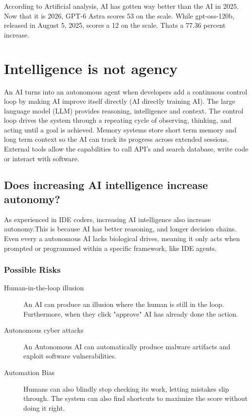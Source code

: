 \documentclass{report}
\begin{document}
	According to Artificial analysis, AI has gotten way better than the AI in 2025. Now that it is 2026, GPT-6 Astra scores 53 on the scale. While gpt-oss-120b, released in August 5, 2025, scores a 12 on the scale. Thats a 77.36 percent increase.
	
	\chapter{Intelligence is not agency}
	An AI turns into an autonomous agent when developers add a continuous control loop by making AI improve itself directly (AI directly training AI). The large language model (LLM) provides reasoning, intelligence and context. The control loop drives the system through a repeating cycle of observing, thinking, and acting until a goal is achieved. Memory systems store short term memory and long term context so the AI can track its progress across extended sessions. External tools allow the capabilities to call API's and search database, write code or interact with software.
	
	\section{Does increasing AI intelligence increase autonomy?}
	As experienced in IDE coders, increasing AI intelligence also increase autonomy.This is because AI has better reasoning, and longer decision chains. Even every a autonomous AI lacks biological drives, meaning it only acts when prompted or programmed within a specific framework, like IDE agents. 
	
	\subsection{Possible Risks}
	\begin{description}
		\item[Human-in-the-loop illusion] An AI can produce an illusion where the human is still in the loop. Furthermore, when they click "approve" AI has already done the action. 
		\item[Autonomous cyber attacks] An Autonomous AI can automatically produce malware artifacts and exploit software vulnerabilities. 
		\item[Automation Bias] Humans can also blindly stop checking its work, letting mistakes slip through. The system can also find shortcuts to maximize the score without doing it right.
	\end{description}
	
\end{document}
